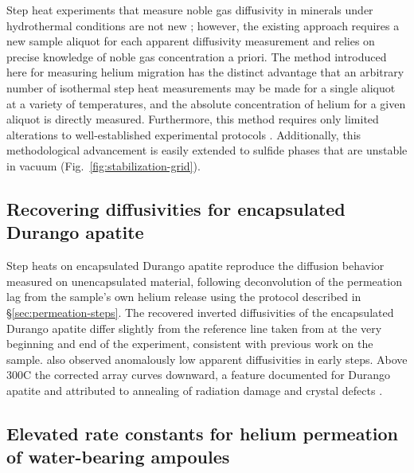 Step heat experiments that measure noble gas diffusivity in minerals under hydrothermal conditions are not new \citep{harrison1982,harrison1985}; however, the existing approach requires a new sample aliquot for each apparent diffusivity measurement and relies on precise knowledge of noble gas concentration a priori. The method introduced here for measuring helium migration has the distinct advantage that an arbitrary number of isothermal step heat measurements may be made for a single aliquot at a variety of temperatures, and the absolute concentration of helium for a given aliquot is directly measured. Furthermore, this method requires only limited alterations to well-established experimental protocols \citep{farley1999}. Additionally, this methodological advancement is easily extended to sulfide phases that are unstable in vacuum (Fig.~\ref{fig:stabilization-grid}).



\subsection{Recovering diffusivities for encapsulated Durango apatite}\label{sec:recover-arrhenius}
Step heats on encapsulated Durango apatite reproduce the diffusion behavior measured on unencapsulated material, following deconvolution of the permeation lag from the sample's own helium release using the protocol described in \S\ref{sec:permeation-steps}. 
The recovered inverted diffusivities of the encapsulated Durango apatite differ slightly from the reference line taken from \citet{farley2000} at the very beginning and end of the experiment, consistent with previous work on the sample. \citet{farley2000} also observed anomalously low apparent diffusivities in early steps. Above 300\textdegree C the corrected array curves downward, a feature documented for Durango apatite and attributed to annealing of radiation damage and crystal defects \citep{wolf1996,farley2000,shuster2006}. 

\subsection{Elevated rate constants for helium permeation of water-bearing ampoules}\label{sec:discussion-rate-constant}

